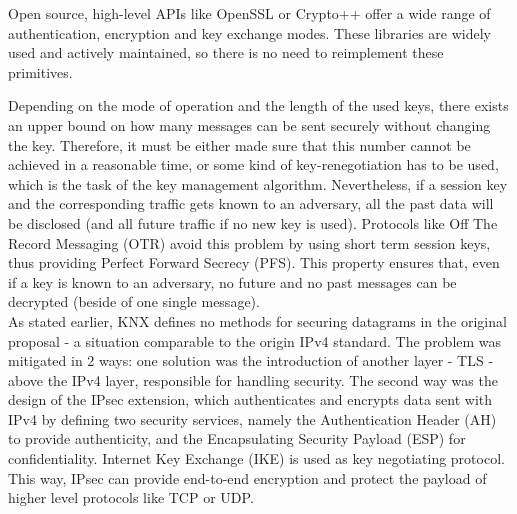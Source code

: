 \documentclass[a4paper,11pt,oneside]{memoir}
\begin{document}
Open source, high-level APIs like OpenSSL or Crypto++ offer a wide range of authentication, encryption and key exchange modes.
These libraries are widely used and actively maintained, so there is no need to reimplement these primitives.

Depending on the mode of operation and the length of the used keys, there exists an upper bound on
 how many messages can be sent securely without changing the key. Therefore, it must be either made sure that this number 
 cannot be achieved in a reasonable time, or some kind of key-renegotiation has to be used, which is the task of the key management algorithm.
 Nevertheless, if a session key and the corresponding traffic gets known to an adversary, all the past data will be disclosed (and all future traffic
 if no new key is used). Protocols like Off The Record Messaging (OTR) \cite{Borisov:2004:OCW:1029179.1029200} avoid this problem by using short term session keys,
 thus providing Perfect Forward Secrecy (PFS). This property ensures that, even if a key is known to an adversary, no future and no past messages can be decrypted (beside of
 one single message).
\\

As stated earlier, KNX defines no methods for securing datagrams in the original proposal - a situation comparable to the origin IPv4 \cite{rfc791} standard.
The problem was mitigated in 2 ways: one solution was 
the introduction of another layer - TLS -  above the IPv4 layer, responsible for handling security.
The second way was the design of the IPsec \cite{rfc4301} 
extension, which authenticates and encrypts data sent with IPv4 by defining two security services,
namely the Authentication Header (AH) to provide authenticity, and the Encapsulating Security Payload (ESP) for confidentiality. Internet
Key Exchange (IKE) is used as key negotiating protocol. This way,
IPsec can provide end-to-end encryption and protect the payload of higher level protocols like TCP or UDP.
\end{document}
